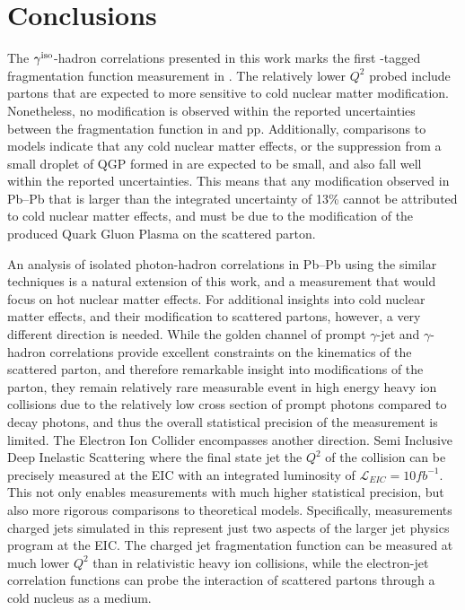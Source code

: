 \chapter{Conclusions}

The $\gamma^\mathrm{iso}$-hadron correlations presented in this work marks the first \gammaiso-tagged fragmentation function measurement in \pPb. The relatively lower $Q^2$ probed include partons that are expected to more sensitive to cold nuclear matter modification. Nonetheless, no modification is observed within the reported uncertainties between the fragmentation function in \pPb and pp. Additionally, comparisons to models indicate that any cold nuclear matter effects, or the suppression from a small droplet of QGP formed in \pPb are expected to be small, and also fall well within the reported uncertainties. This means that any modification observed in Pb--Pb that is larger than the integrated uncertainty of 13\% cannot be attributed to cold nuclear matter effects, and must be due to the modification of the produced Quark Gluon Plasma on the scattered parton.

An analysis of isolated photon-hadron correlations in Pb--Pb using the similar techniques is a natural extension of this work, and a measurement that would focus on hot nuclear matter effects. For additional insights into cold nuclear matter effects, and their modification to scattered partons, however, a very different direction is needed. While the golden channel of prompt $\gamma$-jet and $\gamma$-hadron correlations provide excellent constraints on the kinematics of the scattered parton, and therefore remarkable insight into modifications of the parton, they remain relatively rare measurable event in high energy heavy ion collisions due to the relatively low cross section of prompt photons compared to decay photons, and thus the overall statistical precision of the measurement is limited. The Electron Ion Collider encompasses another direction. Semi Inclusive Deep Inelastic Scattering where the final state jet the $Q^2$ of the collision can be precisely measured at the EIC with an integrated luminosity of $\mathcal{L}_{EIC}=10fb^{-1}$. This not only enables measurements with much higher statistical precision, but also more rigorous comparisons to theoretical models. Specifically, measurements charged jets simulated in this represent just two aspects of the larger jet physics program at the EIC. The charged jet fragmentation function can be measured at much lower $Q^2$ than in relativistic heavy ion collisions, while the electron-jet correlation functions can probe the interaction of scattered partons through a cold nucleus as a medium. 

